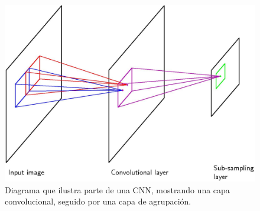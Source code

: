 \documentclass[a4paper,11pt,spanish]{book}
\begin{document}
      \begin{figure}[h]
	\begin{center}
	\includegraphics[width=0.8\linewidth]{./img/bishop_cnn.jpg}
	\end{center}
	\caption{Diagrama que ilustra parte de una CNN, mostrando una capa convolucional, seguido por una capa de agrupación.}
	\label{fig:bishop_cnn}
      \end{figure}

\iffalse
\end{document}
